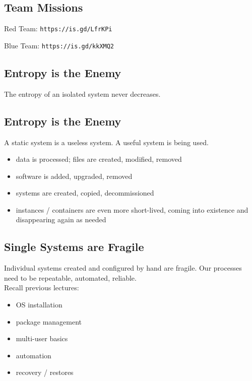 \documentclass[xga]{xdvislides}
\begin{document}
\subsection{Team Missions}
Red Team: \verb+https://is.gd/LfrKPi+ \\

\vspace{.5in}

Blue Team: \verb+https://is.gd/kkXMQ2+ \\

\subsection{Entropy is the Enemy}
\vfill
\Huge
\begin{center}
The entropy of an isolated system never decreases.
\end{center}
\Normalsize
\vfill

\subsection{Entropy is the Enemy}
A static system is a useless system.
A useful system is being used.
\vspace{.5in}
\begin{itemize}
	\item data is processed; files are created, modified, removed
	\item software is added, upgraded, removed
	\item systems are created, copied, decommissioned
	\item instances / containers are even more short-lived,
		coming into existence and disappearing again as needed
\end{itemize}

\subsection{Single Systems are Fragile}
Individual systems created and configured by hand are
fragile.  Our processes need to be repeatable,
automated, reliable. \\

Recall previous lectures:

\begin{itemize}
	\item OS installation
	\item package management
	\item multi-user basics
	\item automation
	\item recovery / restores
\end{itemize}
\end{document}
